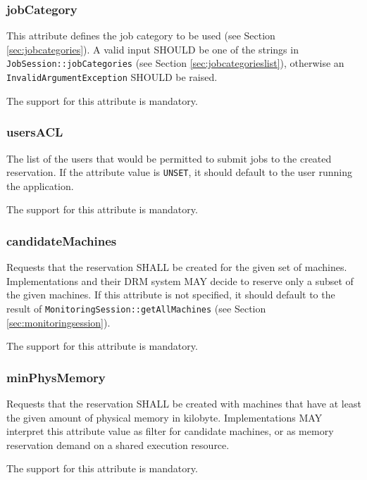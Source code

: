 \documentclass{article}
\newcommand{\h}[1]{\lstinline|#1|}
\newcommand{\rat}[1]{}
\begin{document}
\subsubsection{jobCategory}

This attribute defines the job category to be used (see Section \ref{sec:jobcategories}). A valid input SHOULD be one of the strings in \h{JobSession::jobCategories} (see Section \ref{sec:jobcategorieslist}), otherwise an \h{InvalidArgumentException} SHOULD be raised.

The support for this attribute is mandatory.

\subsubsection{usersACL}

The list of the users that would be permitted to submit jobs to the created reservation. If the attribute value is \h{UNSET}, it should default to the user running the application.

The support for this attribute is mandatory.

\subsubsection{candidateMachines}

Requests that the reservation SHALL be created for the given set of machines. Implementations and their DRM system MAY decide to reserve only a subset of the given machines. If this attribute is not specified, it should default to the result of \h{MonitoringSession::getAllMachines} (see Section \ref{sec:monitoringsession}).

The support for this attribute is mandatory.

\rat{May 18th 2011 conf call identified the subset reservation feature to be only available in some of the systems, so it is no promise here.}

\subsubsection{minPhysMemory}

Requests that the reservation SHALL be created with machines that have at least the given amount of physical memory in kilobyte. Implementations MAY interpret this attribute value as filter for candidate machines, or as memory reservation demand on a shared execution resource.

The support for this attribute is mandatory.
\end{document}
